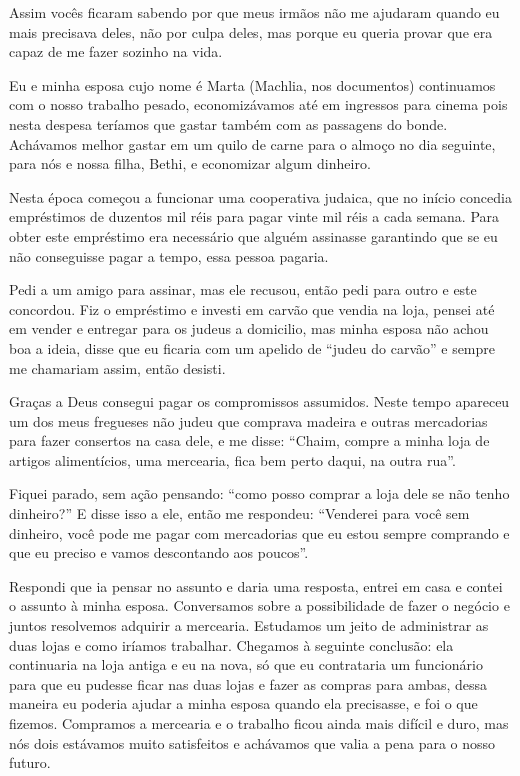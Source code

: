 Assim vocês ficaram sabendo por que meus irmãos não me ajudaram quando
eu mais precisava deles, não por culpa deles, mas porque eu queria
provar que era capaz de me fazer sozinho na vida.

Eu e minha esposa cujo nome é Marta (Machlia, nos documentos) continuamos
com o nosso trabalho pesado, economizávamos até em ingressos para cinema
pois nesta despesa teríamos que gastar também com as passagens do bonde.
Achávamos melhor gastar em um quilo de carne para o almoço no dia
seguinte, para nós e nossa filha, Bethi, e economizar algum dinheiro.

Nesta época começou a funcionar uma cooperativa judaica, que no início
concedia empréstimos de duzentos mil réis para pagar vinte mil réis a
cada semana. Para obter este empréstimo era necessário que alguém
assinasse garantindo que se eu não conseguisse pagar a tempo, essa
pessoa pagaria.

Pedi a um amigo para assinar, mas ele recusou, então pedi para outro e
este concordou. Fiz o empréstimo e investi em carvão que vendia na loja,
pensei até em vender e entregar para os judeus a domicilio, mas minha
esposa não achou boa a ideia, disse que eu ficaria com um apelido de
``judeu do carvão'' e sempre me chamariam assim, então desisti.

Graças a Deus consegui pagar os compromissos assumidos. Neste tempo
apareceu um dos meus fregueses não judeu que comprava madeira e outras
mercadorias para fazer consertos na casa dele, e me disse: ``Chaim,
compre a minha loja de artigos alimentícios, uma mercearia, fica bem
perto daqui, na outra rua''.

Fiquei parado, sem ação pensando: ``como posso comprar a loja dele se
não tenho dinheiro?'' E disse isso a ele, então me respondeu: ``Venderei
para você sem dinheiro, você pode me pagar com mercadorias que eu estou
sempre comprando e que eu preciso e vamos descontando aos poucos''.

Respondi que ia pensar no assunto e daria uma resposta, entrei em casa e
contei o assunto à minha esposa. Conversamos sobre a possibilidade de
fazer o negócio e juntos resolvemos adquirir a mercearia. Estudamos um
jeito de administrar as duas lojas e como iríamos trabalhar. Chegamos à
seguinte conclusão: ela continuaria na loja antiga e eu na nova, só que
eu contrataria um funcionário para que eu pudesse ficar nas duas lojas e
fazer as compras para ambas, dessa maneira eu poderia ajudar a minha
esposa quando ela precisasse, e foi o que fizemos. Compramos a mercearia
e o trabalho ficou ainda mais difícil e duro, mas nós dois estávamos
muito satisfeitos e achávamos que valia a pena para o nosso futuro.

